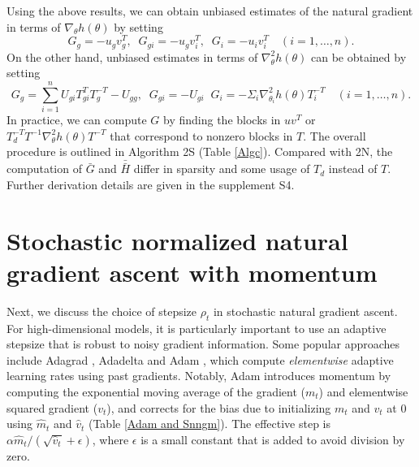 \documentclass{statsoc}
\newcommand{\dH}{\bar{\bar{H}}}
\begin{document}
Using the above results, we can obtain unbiased estimates of the natural gradient in terms of $\nabla_\theta h(\theta)$ by setting
\[
G_g = -u_g v_g^T, \;\; G_{gi} = -u_gv_i^T, \;\;G_i = - u_i v_i^T \quad ( i=1, \dots, n).
\]
On the other hand, unbiased estimates in terms of $\nabla_\theta^2 h(\theta)$ can be obtained by setting
\[
G_g = \sum_{i=1}^n U_{gi} T_{gi}^TT_g^{-T} - U_{gg}, \;\; 
G_{gi} = -U_{gi} \;\;
G_i = - \Sigma_i  \nabla_{\theta_i}^2 h(\theta)  T_i^{-T} \quad ( i=1, \dots, n).
\]
In practice, we can compute $G$ by finding the blocks in $uv^T$ or $T_d^{-T} T^{-1} \nabla_\theta^2 h(\theta)T^{-T}$  that correspond to nonzero blocks in $T$. 
The overall procedure is outlined in Algorithm 2S (Table \ref{Algc}). Compared with 2N, the computation of $\bar{G}$ and $\dH$ differ in sparsity and some usage of $T_d$ instead of $T$. Further derivation details are given in the supplement S4.



 
\section{Stochastic normalized natural gradient ascent with momentum} \label{sec_Normalized SGD}
Next, we discuss the choice of stepsize $\rho_t$ in stochastic natural gradient ascent. For high-dimensional models, it is particularly important to use an adaptive stepsize that is robust to noisy gradient information. Some popular approaches include Adagrad \citep{Duchi2011}, Adadelta \citep{Zeiler2012} and Adam \citep{Kingma2015}, which compute {\em elementwise} adaptive learning rates using past gradients. Notably, Adam  introduces momentum by computing the exponential moving average of the gradient ($m_t$) and elementwise squared gradient ($v_t$), and corrects for the bias due to initializing $m_t$ and $v_t$ at 0 using $\widehat{m}_t$ and $\widehat{v}_t$ (Table \ref{Adam and Snngm}). The effective step is $\alpha \widehat{m}_t/(\sqrt{\widehat{v}_t} + \epsilon)$, where $\epsilon$ is a small constant that is added to avoid division by zero. 
\end{document}
